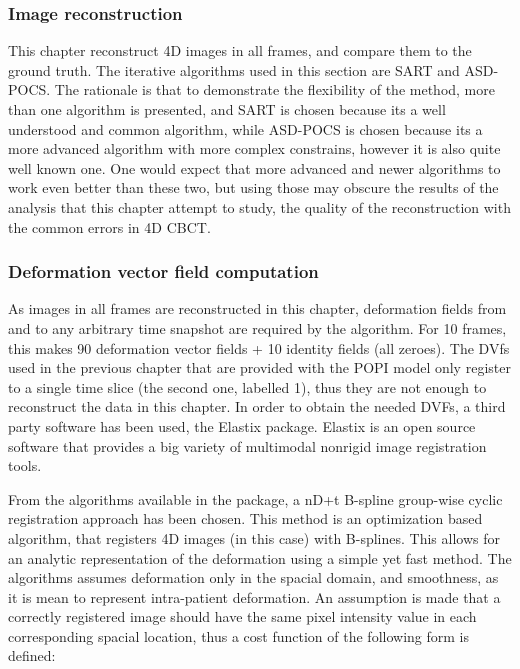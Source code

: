 \subsubsection{Image reconstruction}

This chapter reconstruct 4D images in all frames, and compare them to the ground truth. The iterative algorithms used in this section are SART and ASD-POCS. The rationale is that to demonstrate the flexibility of the method, more than one algorithm is presented, and SART is chosen because its a well understood and common algorithm, while ASD-POCS is chosen because its a more advanced algorithm with more complex constrains, however it is also quite well known one. One would expect that more advanced and newer algorithms to work even better than these two, but using those may obscure the results of the analysis that this chapter attempt to study, the quality of the reconstruction with the common errors in 4D CBCT.

\subsubsection{Deformation vector field computation}

As images in all frames are reconstructed in this chapter, deformation fields from and to any arbitrary time snapshot are required by the algorithm. For 10 frames, this makes 90 deformation vector fields + 10 identity fields (all zeroes). The DVfs used in the previous chapter that are provided with the POPI model only register to a single time slice (the second one, labelled 1), thus they are not enough to reconstruct the data in this chapter. In order to obtain the needed DVFs, a third party software has been used, the Elastix\cite{elastix} package. Elastix is an open source software that provides a big variety of multimodal nonrigid image registration tools. 

From the algorithms available in the package, a nD+t B-spline group-wise cyclic registration\cite{metz2011nonrigid} approach has been chosen. This method is an optimization based algorithm, that registers 4D images (in this case) with B-splines. This allows for an analytic representation of the deformation using a simple yet fast method. The algorithms assumes deformation only in the spacial domain, and smoothness, as it is mean to represent intra-patient deformation. An assumption is made that a correctly registered image should have the same pixel intensity value in each corresponding spacial location, thus a cost function of the following form is defined:

